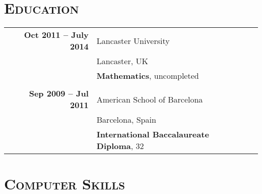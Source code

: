 \documentclass[a4paper,10pt]{article} %
\begin{document}

\section{\textsc{Education}}

\begin{tabularx}{\textwidth}{XrlXr}
  &  \textbf{Oct 2011 -- July 2014} & Lancaster University & &\\
  &                                 & Lancaster, UK & & \\
  &                                 & \textbf{Mathematics}, uncompleted & &\\
\multicolumn{5}{c}{}\\ %
  &  \textbf{Sep 2009 -- Jul 2011}  & American School of Barcelona & &\\
  &                                 & Barcelona, Spain & &\\
  &                                 & \textbf{International Baccalaureate Diploma}, 32 & &\\
\end{tabularx}


\section{\textsc{Computer Skills}}
\end{document}
